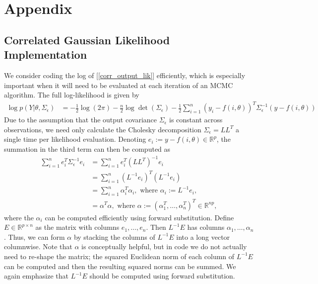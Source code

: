 \documentclass[12pt]{article}
\newcommand{\R}{\mathbb{R}}
\begin{document}
\section{Appendix}

\subsection{Correlated Gaussian Likelihood Implementation} \label{corr_output_lik_implementation}
We consider coding the log of [\ref{corr_output_lik}] efficiently, which is especially important when it will need to be evaluated at each iteration of an
MCMC algorithm. The full log-likelihood is given by 
\begin{align}
\log p(Y|\theta, \Sigma_\epsilon) &= -\frac{1}{2} \log(2\pi) -\frac{n}{2} \log \det(\Sigma_\epsilon) - \frac{1}{2} \sum_{i = 1}^{n} (y_i - f(i, \theta))^T \Sigma_\epsilon^{-1} (y - f(i, \theta)) \label{log_lik_corr_outputs}
\end{align}
Due to the assumption that the output covariance $\Sigma_\epsilon$ is constant across observations, we need only calculate the Cholesky decomposition 
$\Sigma_\epsilon = LL^T$ a single time per likelihood evaluation. Denoting $e_i := y - f(i, \theta) \in \R^p$, the summation in the third term can then be computed as
\begin{align}
\sum_{i = 1}^{n} e_i^T \Sigma_\epsilon^{-1} e_i &= \sum_{i = 1}^{n} e_i^T (L L^T)^{-1} e_i \\
									&= \sum_{i = 1}^{n} (L^{-1} e_i)^T (L^{-1} e_i) \nonumber \\
									&=  \sum_{i = 1}^{n} \alpha_i^T \alpha_i, \text{ where } \alpha_i := L^{-1}e_i, \nonumber \\
									&= \alpha^T \alpha, \text{ where } \alpha := (\alpha_1^T, \dots, \alpha_n^T)^T \in \R^{np}, \nonumber
\end{align}
where the $\alpha_i$ can be computed efficiently using forward substitution. Define $E \in \R^{p \times n}$ as the matrix with columns $e_1, \dots, e_n$. 
Then $L^{-1}E$ has columns $\alpha_1, \dots, \alpha_n$. Thus, we can form $\alpha$ by stacking the columns of $L^{-1}E$ into a long vector 
columnwise. Note that $\alpha$ is conceptually helpful, but in code we do not actually need to re-shape the matrix; the squared Euclidean norm of each column 
of $L^{-1}E$ can be computed and then the resulting squared norms can be summed. We again emphasize that $L^{-1}E$ should be computed using forward 
substitution. 
\end{document}
